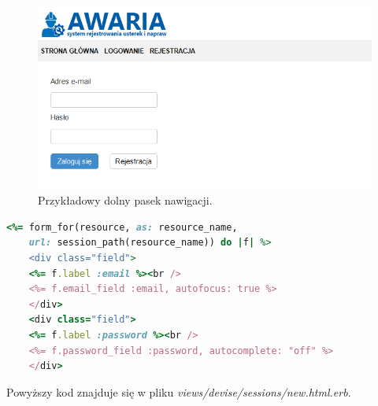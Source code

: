 \documentclass[openright]{xmgr}
\begin{document}
	\begin{figure}[!tbh]
		\centering
		\includegraphics[width=\linewidth]{image/panel}
		\caption{Przykładowy dolny pasek nawigacji.}
	\end{figure}
	
	\newpage
	\begin{lstlisting}[language=Ruby,lineskip={-1pt},caption=Cześć kodu Ruby nieostylowanego kodem HTML]
	<%= form_for(resource, as: resource_name,
	url: session_path(resource_name)) do |f| %>
	<div class="field">
	<%= f.label :email %><br />
	<%= f.email_field :email, autofocus: true %>
	</div>
	<div class="field">
	<%= f.label :password %><br />
	<%= f.password_field :password, autocomplete: "off" %>
	</div>
	\end{lstlisting} 
	
	Powyższy kod znajduje się w pliku
	\textit{views/devise/sessions/new.html.erb}. 
	
\end{document}
